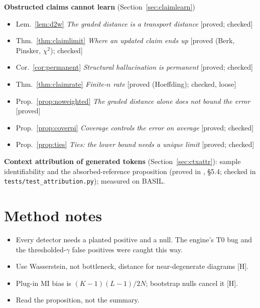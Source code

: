 \documentclass[11pt]{article}
\theoremstyle{definition}
\theoremstyle{remark}
\newcommand{\src}[1]{\textsf{\small[#1]}}
\begin{document}
\noindent\textbf{Obstructed claims cannot learn} (Section~\ref{sec:claimlearn})
\begin{itemize}[itemsep=0pt]
  \item Lem.~\ref{lem:d2w} \emph{The graded distance is a transport distance} [proved; checked]
  \item Thm.~\ref{thm:claimlimit} \emph{Where an updated claim ends up} [proved (Berk, Pinsker, $\chi^2$); checked]
  \item Cor.~\ref{cor:permanent} \emph{Structural hallucination is permanent} [proved; checked]
  \item Thm.~\ref{thm:claimrate} \emph{Finite-$n$ rate} [proved (Hoeffding); checked, loose]
  \item Prop.~\ref{prop:noweighted} \emph{The graded distance alone does not bound the error} [proved]
  \item Prop.~\ref{prop:coverpi} \emph{Coverage controls the error on average} [proved; checked]
  \item Prop.~\ref{prop:ties} \emph{Ties: the lower bound needs a unique limit} [proved; checked]
\end{itemize}
\noindent\textbf{Context attribution of generated tokens} (Section~\ref{sec:ctxattr}): sample identifiability and the absorbed-reference proposition (proved in \cite{awasthiT}, \S5.4; checked in \texttt{tests/test\_attribution.py}); measured on BASIL.

\section{Method notes}
\begin{itemize}
  \item Every detector needs a planted positive and a null. The engine's T0 bug and the thresholded-$\gamma$ false positives were caught this way.
  \item Use Wasserstein, not bottleneck, distance for near-degenerate diagrams \src{H}.
  \item Plug-in MI bias is $(K-1)(L-1)/2N$; bootstrap nulls cancel it \src{H}.
  \item Read the proposition, not the summary.
\end{itemize}
\end{document}
